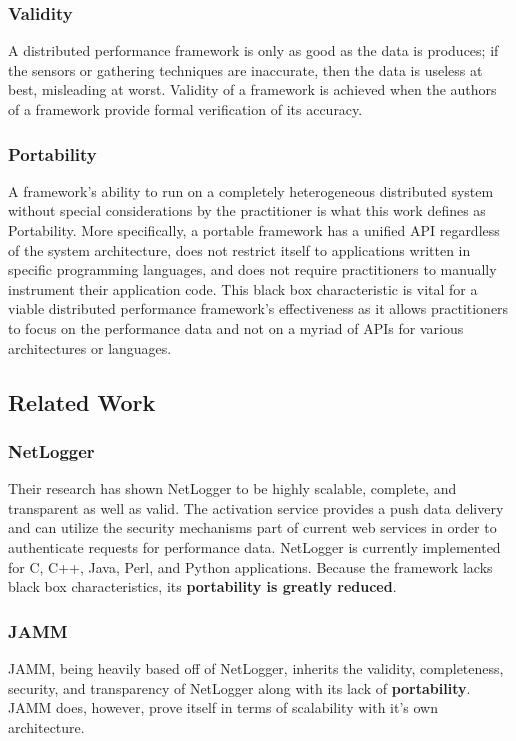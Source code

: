 \documentclass{beamer}
\begin{document}
\begin{frame}
\frametitle{Validity}
A distributed performance framework is only as good as the data is produces; if the sensors or gathering techniques are
inaccurate, then the data is useless at best, misleading at worst. Validity of a framework is achieved when the authors
of a framework provide formal verification of its accuracy.
\end{frame}

\begin{frame}
\frametitle{Portability}
A framework's ability to run on a completely heterogeneous distributed system without special considerations by the
practitioner is what this work defines as Portability. More specifically, a portable framework has a unified API
regardless of the system architecture, does not restrict itself to applications written in specific programming
languages, and does not require practitioners to manually instrument their application code. This black box
characteristic is vital for a viable distributed performance framework's effectiveness as it allows practitioners to
focus on the performance data and not on a myriad of APIs for various architectures or languages.
\end{frame}

\subsection{Related Work}

\begin{frame}
\frametitle{NetLogger}
Their research has shown NetLogger to be highly scalable, complete, and transparent as well as valid. The activation
service provides a push data delivery and can utilize the security mechanisms part of current web services in order to
authenticate requests for performance data. NetLogger is currently implemented for C, C++, Java, Perl, and Python
applications. Because the framework lacks black box characteristics, its \textbf{portability is greatly reduced}.
\end{frame}

\begin{frame}
\frametitle{JAMM}
JAMM, being heavily based off of NetLogger, inherits the validity, completeness, security, and transparency of NetLogger
along with its lack of \textbf{portability}. JAMM does, however, prove itself in terms of scalability with it's own
architecture.
\end{frame}
\end{document}
